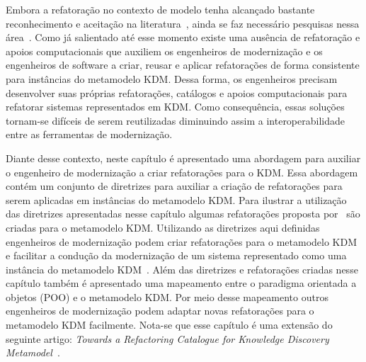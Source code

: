 Embora a refatoração no contexto de modelo tenha alcançado bastante reconhecimento e aceitação na literatura~\cite{Moghadam_2012, Maneerat_2011, Fourati_2011, Einarsson_2012, Steimann_2015, Akiyama_2011, Jensen_2010, Arendt_2012, Millan_2009, Tom_2008_2008}, ainda se faz necessário pesquisas nessa área~\cite{durelli_systematic_mapping, revisao_sistematica_uml_refactoring}. Como já salientado até esse momento existe uma ausência de refatoração e apoios computacionais que auxiliem os engenheiros de modernização e os engenheiros de software a criar, reusar e aplicar refatorações de forma consistente para instâncias do metamodelo KDM. Dessa forma, os engenheiros precisam desenvolver suas próprias refatorações, catálogos e apoios computacionais para refatorar sistemas representados em KDM. Como consequência, essas soluções tornam-se difíceis de serem reutilizadas diminuindo assim a interoperabilidade entre as ferramentas de modernização. 

Diante desse contexto, neste capítulo é apresentado uma abordagem para auxiliar o engenheiro de modernização a criar refatorações para o KDM. Essa abordagem contém um conjunto de diretrizes para auxiliar a criação de refatorações para serem aplicadas em instâncias do metamodelo KDM. Para ilustrar a utilização das diretrizes apresentadas nesse capítulo algumas refatorações proposta por~ são criadas para o metamodelo KDM. Utilizando as diretrizes aqui definidas engenheiros de modernização podem criar refatorações para o metamodelo KDM e facilitar a condução da modernização de um sistema representado como uma instância do metamodelo KDM~\cite{durelli_catalogo, durelli_VEM_ferramenta}. Além das diretrizes e refatorações criadas nesse capítulo também é apresentado uma mapeamento entre o paradigma orientada a objetos (POO) e o metamodelo KDM. Por meio desse mapeamento outros engenheiros de modernização podem adaptar novas refatorações para o metamodelo KDM facilmente. Nota-se que esse capítulo é uma extensão do seguinte artigo: \textit{Towards a Refactoring Catalogue for Knowledge Discovery Metamodel}~\cite{durelli_catalogo}.




